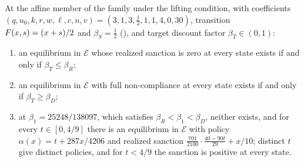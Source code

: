 \begin{proposition}
\label{prop:affine-window}
At the affine member of the family under the lifting condition, with coefficients
$(q,u_0,k,r,w,\ell,c,n,v)=(3,1,3,\tfrac12,1,1,4,0,30)$, transition
$F(x,s)=(x+s)/2$ and $\beta_S=\tfrac12$ (), and target
discount factor $\beta_T\in(0,1)$:
\begin{enumerate}[label=(\roman*)]
\item an equilibrium in $\mathcal E$ whose realized sanction is zero at every state
exists if and only if $\beta_T\le\beta_R$;
\item an equilibrium in $\mathcal E$ with full non-compliance at every state exists if and
only if $\beta_T\ge\beta_D$;
\item at $\beta_1=25248/138097$, which satisfies $\beta_R<\beta_1<\beta_D$, neither
exists, and for every $t\in[0,4/9]$ there is an equilibrium in $\mathcal E$ with policy
$\alpha(x)=t+287x/4206$ and realized sanction
$\tfrac{701}{2100}\cdot\tfrac{40-90t}{29}+x/10$; distinct $t$ give distinct policies,
and for $t<4/9$ the sanction is positive at every state.
\end{enumerate}
\end{proposition}

